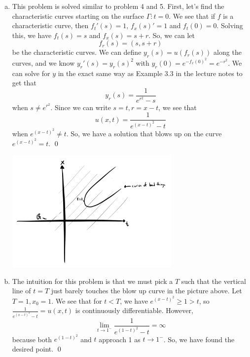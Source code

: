 \documentclass{article}
\begin{document}
\begin{enumerate}[(a)]
    \item This problem is solved similar to problem 4 and 5. First, let's find the characteristic curves starting on the surface $\Gamma: t = 0$. We see that if $f$ is a characteristic curve, then $f_t'(s) = 1$, $f_x(s)' =1$ and $f_t(0)= 0$.
    \hop
    Solving this, we have $f_t(s) = s$ and $f_x(s) = s+r$. So, we can let
    \[f_r(s)=(s, s+r)\]
    be the characteristic curves. We can define $y_r(s) = u(f_r(s))$ along the curves, and we know $y_r'(s) = y_r(s)^2$ with $y_r(0) = e^{-f_x(0)^2} = e^{-r^2}$. 
    \hop
    We can solve for $y$ in the exact same way as Example 3.3 in the lecture notes to get that 
    \[y_r(s) = \frac{1}{e^{r^2}-s}\]
    when $s \ne e^{r^2}$. Since we can write $s = t, r = x-t$, we see that 
    \[u(x,t) = \frac{1}{e^{(x-t)^2}-t}\]
    when $e^{(x-t)^2} \ne t$. So, we have a solution that blows up on the curve $e^{(x-t)^2} = t$. \qed

    \begin{center}
        \includegraphics[height=6cm]{../images/comet}
    \end{center}

    \item The intuition for this problem is that we must pick a $T$ such that the vertical line of $t = T$ just barely touches the blow up curve in the picture above.
    \hop
    Let $T=1, x_0 = 1$. We see that for $t < T$, we have $e^{(x-t)^2} \ge 1 > t$,  so $\frac{1}{e^{(x-t)^2}-t} = u(x,t)$ is continuously differentiable. However, 
    \[\lim_{t \to 1^-}\frac{1}{e^{(1-t)^2}-t} = \infty\]
    because both $e^{(1-t)^2}$ and $t$ approach 1 as $t \to 1^-$. So, we have found the desired point. \qed
\end{enumerate}
\end{document}

